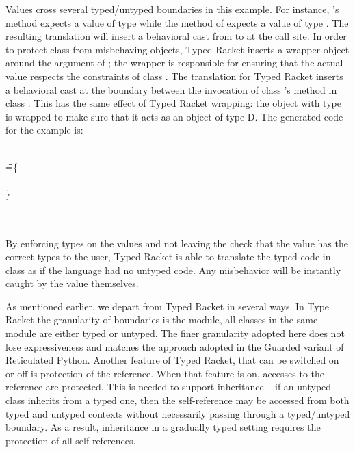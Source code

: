 \documentclass{tex/llncs}
\begin{document}
\noindent Values cross several typed/untyped boundaries in this example.
For instance, \A's method \m expects a value of type \any while the method 
\m of \D expects a value of type \D.  The resulting
translation will insert a behavioral cast from \any to \D at the call site.  
In order to protect class \D from misbehaving objects, Typed Racket inserts a wrapper
object around the argument of \D; the wrapper is responsible for ensuring
that the actual value respects the constraints of class \D.  The \kafka
translation for Typed Racket inserts a behavioral cast at the boundary
between the invocation of class \D's method \m in class \A.  This has the
same effect of Typed Racket wrapping: the object with type \C is wrapped to
make sure that it acts as an object of type {\xt D}.  The generated \kafka
code for the example is:

\medskip
\begin{minipage}{\textwidth}
\begin{tabbing}
\HS\HS \KCall{\New\A{}}\m{\BehCast\any{\New\C{}}}\any\any \\
\HS\HS\HS\HS\HS\HS\HS\HS\HS
\WHERE\HS\K\HS=\HS\=
\class\= \A \{\\
\>\HS \Mdef\m\x\any\any{ ~ \BehCast\any{\KCall{\New\D{}}\m{\BehCast\D\x}{\D}\D~}} \\
\>\}\\
 \>  \Class\D{}{\Mdef\m\x\D\D{\KCall\x\m\x\D\D}} \\
 \>  \Class{\C}{}{\Mdef\m\x{\any}{\any}{\x}} \\
\end{tabbing}
\end{minipage}
\medskip


\noindent By enforcing types on the values and not leaving the check that
the value has the correct types to the user, Typed Racket is able to
translate the typed code in class \D as if the language had no untyped
code. Any misbehavior will be instantly caught by the value themselves.

As mentioned earlier, we depart from Typed Racket in several ways. In Type
Racket the granularity of boundaries is the module, all classes in the same
module are either typed or untyped.  The finer granularity adopted here does
not lose expressiveness and matches the approach adopted in the Guarded
variant of Reticulated Python. Another feature of Typed Racket, that can be
switched on or off is protection of the \this reference. When that feature
is on, accesses to the \this reference are protected. This is needed to
support inheritance -- if an untyped class inherits from a typed one, then
the self-reference may be accessed from both typed and untyped contexts
without necessarily passing through a typed/untyped boundary. As a result,
inheritance in a gradually typed setting requires the protection of all
self-references.
\end{document}
